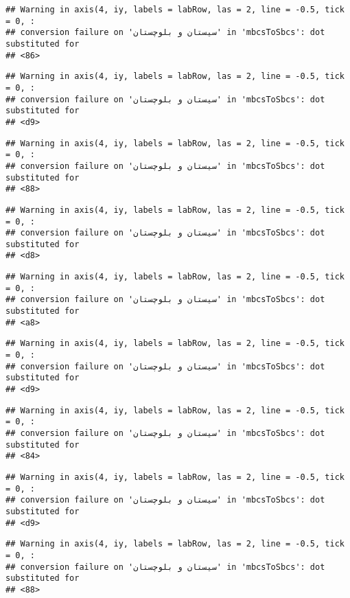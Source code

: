 \documentclass[
]{article}
\begin{document}
\begin{verbatim}
## Warning in axis(4, iy, labels = labRow, las = 2, line = -0.5, tick = 0, :
## conversion failure on 'سیستان و بلوچستان' in 'mbcsToSbcs': dot substituted for
## <86>
\end{verbatim}

\begin{verbatim}
## Warning in axis(4, iy, labels = labRow, las = 2, line = -0.5, tick = 0, :
## conversion failure on 'سیستان و بلوچستان' in 'mbcsToSbcs': dot substituted for
## <d9>
\end{verbatim}

\begin{verbatim}
## Warning in axis(4, iy, labels = labRow, las = 2, line = -0.5, tick = 0, :
## conversion failure on 'سیستان و بلوچستان' in 'mbcsToSbcs': dot substituted for
## <88>
\end{verbatim}

\begin{verbatim}
## Warning in axis(4, iy, labels = labRow, las = 2, line = -0.5, tick = 0, :
## conversion failure on 'سیستان و بلوچستان' in 'mbcsToSbcs': dot substituted for
## <d8>
\end{verbatim}

\begin{verbatim}
## Warning in axis(4, iy, labels = labRow, las = 2, line = -0.5, tick = 0, :
## conversion failure on 'سیستان و بلوچستان' in 'mbcsToSbcs': dot substituted for
## <a8>
\end{verbatim}

\begin{verbatim}
## Warning in axis(4, iy, labels = labRow, las = 2, line = -0.5, tick = 0, :
## conversion failure on 'سیستان و بلوچستان' in 'mbcsToSbcs': dot substituted for
## <d9>
\end{verbatim}

\begin{verbatim}
## Warning in axis(4, iy, labels = labRow, las = 2, line = -0.5, tick = 0, :
## conversion failure on 'سیستان و بلوچستان' in 'mbcsToSbcs': dot substituted for
## <84>
\end{verbatim}

\begin{verbatim}
## Warning in axis(4, iy, labels = labRow, las = 2, line = -0.5, tick = 0, :
## conversion failure on 'سیستان و بلوچستان' in 'mbcsToSbcs': dot substituted for
## <d9>
\end{verbatim}

\begin{verbatim}
## Warning in axis(4, iy, labels = labRow, las = 2, line = -0.5, tick = 0, :
## conversion failure on 'سیستان و بلوچستان' in 'mbcsToSbcs': dot substituted for
## <88>
\end{verbatim}
\end{document}
